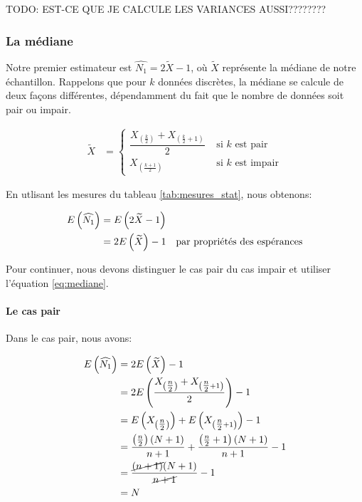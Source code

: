 \documentclass[10pt]{article}
\begin{document}
TODO: EST-CE QUE JE CALCULE LES VARIANCES AUSSI????????

\subsubsection{La médiane}\label{la-mediane}

Notre premier estimateur est \(\widehat{N_1}=2\widetilde{X}-1\), où
\(\widetilde{X}\) représente la médiane de notre échantillon. Rappelons
que pour \(k\) données discrètes, la médiane se calcule de deux façons
différentes, dépendamment du fait que le nombre de données soit pair ou
impair.

\begin{align}
\widetilde{X} &= 
\begin{cases}
\dfrac{X_{\left(\tfrac{k}{2}\right)}+X_{\left(\tfrac{k}{2}+1\right)}}{2} & \text{ si $k$ est pair} \\
X_{\left(\tfrac{k+1}{2}\right)} & \text{ si $k$ est impair}
\end{cases}
\label{eq:mediane}
\end{align}

En utlisant les mesures du tableau \ref{tab:mesures_stat}, nous
obtenons:

\begin{align*}
E\left(\widehat{N_1}\right) &= E\left(2\widetilde{X}-1\right) \\
&= 2E\left(\widetilde{X}\right)-1 \quad \text{par propriétés des espérances}
\end{align*}

Pour continuer, nous devons distinguer le cas pair du cas impair et
utiliser l'équation \ref{eq:mediane}.

\paragraph{Le cas pair}\label{le-cas-pair}

Dans le cas pair, nous avons:

\begin{align*}
E\left(\widehat{N_1}\right) &= 2E\left(\widetilde{X}\right)-1 \\
&= 2E\left(\dfrac{X_{\left(\tfrac{n}{2}\right)}+X_{\left(\tfrac{n}{2}+1\right)}}{2}\right)-1 \\
&= E\left(X_{\left(\tfrac{n}{2}\right)}\right)+E\left(X_{\left(\tfrac{n}{2}+1\right)}\right)-1 \\
&= \dfrac{\left(\tfrac{n}{2}\right)(N+1)}{n+1}+\dfrac{\left(\tfrac{n}{2}+1\right)(N+1)}{n+1}-1 \\
&= \dfrac{\cancel{(n+1)}(N+1)}{\cancel{n+1}}-1 \\
&= N
\end{align*}
\end{document}
